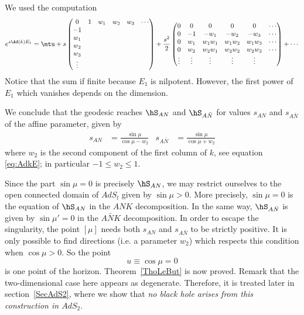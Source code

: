 We used the computation
\[
  e^{s\Ad(k)E_1}=\mtu+s
\begin{pmatrix}
0&1&w_1&w_2&w_3&\cdots\\
-1\\w_1\\w_2\\w_3\\\vdots
\end{pmatrix}
+\frac{s^2}{2}
\begin{pmatrix}
0&0&0&0&0&\cdots\\
0&-1&-w_1&-w_2&-w_3&\cdots\\
0&w_1&w_1w_1&w_1w_2&w_1w_3&\cdots\\
0&w_2&w_2w_1&w_2w_2&w_2w_3&\cdots\\
\vdots&\vdots&\vdots&\vdots&\vdots
\end{pmatrix}
+\cdots
\]
Notice that the sum if finite because $E_1$ is nilpotent. However, the first power of $E_1$ which vanishes depends on the dimension.

We conclude that the geodesic reaches $\hS_{AN}$ and $\hS_{A\bar{N}}$ for values $s_{AN}$ and $s_{A\bar{N}}$ of the affine parameter, given by
\begin{align}   \label{eq:tempssingul}
 s_{AN}&= \frac{\sin\mu}{\cos\mu - w_2}&s_{A\bar{N}}&= \frac{\sin\mu}{\cos\mu + w_2}
\end{align}
where $w_{2}$ is the second component of the first column of $k$, see equation \eqref{eq:AdkE}; in particular $-1\leq w_2 \leq 1$.

Since the part $\sin \mu =0$ is precisely  $\hS_{AN}$, we may restrict ourselves to the open connected domain of $AdS_l$ given by $\sin \mu > 0$. More precisely, $\sin\mu=0$ is the equation of $\hS_{AN}$ in the $ANK$ decomposition. In the same way, $\hS_{A\bar{N}}$ is given by $\sin\mu'=0$ in the $A\bar{N}K$ decomposition.  In order to escape the singularity, the point $[\mu]$ needs both $s_{AN}$ and $s_{A\bar{N}}$ to be strictly positive.  It is only possible to find directions (i.e. a parameter $w_2$) which respects this condition when $\cos \mu>0$.  So the point
\begin{equation}  \label{EqUnPtHoriz}
u\equiv \cos\mu=0
\end{equation}
is one point of the horizon. Theorem~\ref{ThoLeBut} is now proved. Remark that the two-dimensional case here appears as degenerate. Therefore, it is treated later in section~\ref{SecAdS2}, where we show that \emph{no black hole arises from this construction in $AdS_2$}.

